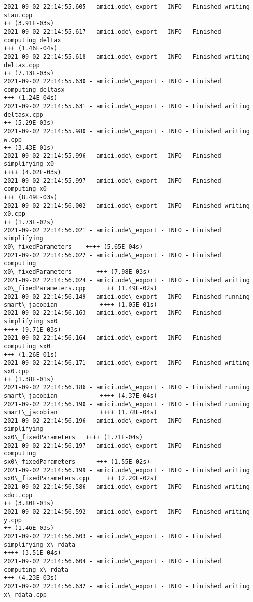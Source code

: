 \documentclass[11pt]{article}
\begin{document}
\begin{Verbatim}[commandchars=\\\{\}]
2021-09-02 22:14:55.605 - amici.ode\_export - INFO - Finished writing stau.cpp
++ (3.91E-03s)
2021-09-02 22:14:55.617 - amici.ode\_export - INFO - Finished computing deltax
+++ (1.46E-04s)
2021-09-02 22:14:55.618 - amici.ode\_export - INFO - Finished writing deltax.cpp
++ (7.13E-03s)
2021-09-02 22:14:55.630 - amici.ode\_export - INFO - Finished computing deltasx
+++ (1.24E-04s)
2021-09-02 22:14:55.631 - amici.ode\_export - INFO - Finished writing deltasx.cpp
++ (5.29E-03s)
2021-09-02 22:14:55.980 - amici.ode\_export - INFO - Finished writing w.cpp
++ (3.43E-01s)
2021-09-02 22:14:55.996 - amici.ode\_export - INFO - Finished simplifying x0
++++ (4.02E-03s)
2021-09-02 22:14:55.997 - amici.ode\_export - INFO - Finished computing x0
+++ (8.49E-03s)
2021-09-02 22:14:56.002 - amici.ode\_export - INFO - Finished writing x0.cpp
++ (1.73E-02s)
2021-09-02 22:14:56.021 - amici.ode\_export - INFO - Finished simplifying
x0\_fixedParameters    ++++ (5.65E-04s)
2021-09-02 22:14:56.022 - amici.ode\_export - INFO - Finished computing
x0\_fixedParameters       +++ (7.98E-03s)
2021-09-02 22:14:56.024 - amici.ode\_export - INFO - Finished writing
x0\_fixedParameters.cpp      ++ (1.49E-02s)
2021-09-02 22:14:56.149 - amici.ode\_export - INFO - Finished running
smart\_jacobian            ++++ (1.05E-01s)
2021-09-02 22:14:56.163 - amici.ode\_export - INFO - Finished simplifying sx0
++++ (9.71E-03s)
2021-09-02 22:14:56.164 - amici.ode\_export - INFO - Finished computing sx0
+++ (1.26E-01s)
2021-09-02 22:14:56.171 - amici.ode\_export - INFO - Finished writing sx0.cpp
++ (1.38E-01s)
2021-09-02 22:14:56.186 - amici.ode\_export - INFO - Finished running
smart\_jacobian            ++++ (4.37E-04s)
2021-09-02 22:14:56.190 - amici.ode\_export - INFO - Finished running
smart\_jacobian            ++++ (1.78E-04s)
2021-09-02 22:14:56.196 - amici.ode\_export - INFO - Finished simplifying
sx0\_fixedParameters   ++++ (1.71E-04s)
2021-09-02 22:14:56.197 - amici.ode\_export - INFO - Finished computing
sx0\_fixedParameters      +++ (1.55E-02s)
2021-09-02 22:14:56.199 - amici.ode\_export - INFO - Finished writing
sx0\_fixedParameters.cpp     ++ (2.20E-02s)
2021-09-02 22:14:56.586 - amici.ode\_export - INFO - Finished writing xdot.cpp
++ (3.80E-01s)
2021-09-02 22:14:56.592 - amici.ode\_export - INFO - Finished writing y.cpp
++ (1.46E-03s)
2021-09-02 22:14:56.603 - amici.ode\_export - INFO - Finished simplifying x\_rdata
++++ (3.51E-04s)
2021-09-02 22:14:56.604 - amici.ode\_export - INFO - Finished computing x\_rdata
+++ (4.23E-03s)
2021-09-02 22:14:56.632 - amici.ode\_export - INFO - Finished writing x\_rdata.cpp

\end{Verbatim}
\end{document}

